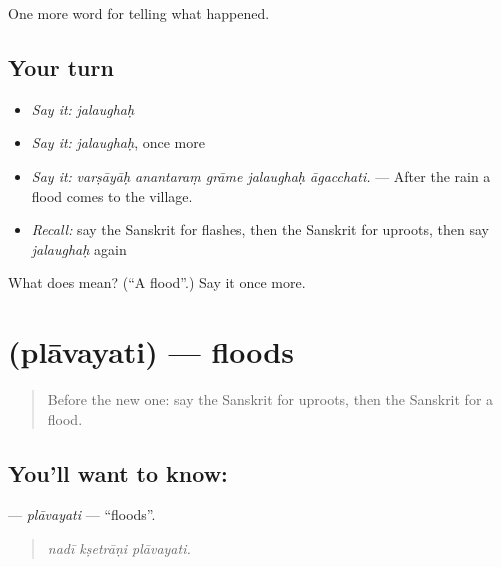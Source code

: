 \begin{grammarlens}[title={What you've built}]
One more word for telling what happened.
\end{grammarlens}

\subsection*{Your turn}
\begin{itemize}
\raggedright
  \item \emph{Say it:} \emph{jalaughaḥ}
  \item \emph{Say it:} \emph{jalaughaḥ}, once more
  \item \emph{Say it:} \emph{varṣāyāḥ anantaraṃ grāme jalaughaḥ āgacchati.} — After the rain a flood comes to the village.
  \item \emph{Recall:} say the Sanskrit for flashes, then the Sanskrit for uproots, then say \emph{jalaughaḥ} again
\end{itemize}

\begin{tcolorbox}[breakable,colback=teal!4,colframe=teal!35!black,title={Before you move on}]
What does  mean? (\textquotedblleft{}A flood\textquotedblright{}.) Say it once more.
\end{tcolorbox}
\section[\texorpdfstring{\sk{प्लावयति} (plāvayati)}{प्लावयति (plāvayati)}]{ (plāvayati) — floods}

\label{lesson:SA-C302-plavayati}



\begin{quote}
Before the new one: say the Sanskrit for uproots, then the Sanskrit for a flood.
\end{quote}

\subsection*{You'll want to know: }
\textbf{} — \emph{plāvayati} — \textquotedblleft{}floods\textquotedblright{}.

\begin{quote}
  
\end{quote}

\begin{quote}
\emph{nadī kṣetrāṇi plāvayati.}
\end{quote}

